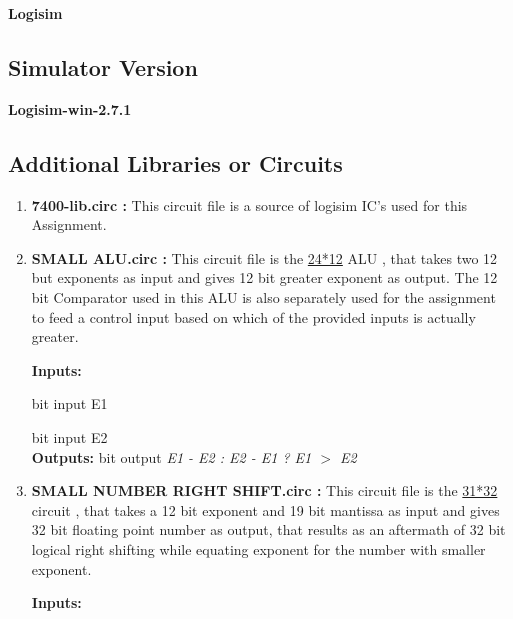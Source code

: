 \documentclass[12pt]{article}
\begin{document}
\textbf{Logisim}

\subsection{Simulator Version}

\textbf{Logisim-win-2.7.1}

\subsection{Additional Libraries or Circuits}

\begin{enumerate}
    \item \textbf{7400-lib.circ : } This circuit file is a source of logisim IC's used for this Assignment.

    \item \textbf{SMALL ALU.circ : } This circuit file is the \underline{24*12} ALU , that takes two 12 but exponents as input and gives 12 bit greater exponent as output. The 12 bit Comparator used in this ALU is also separately used for the assignment to feed a control input based on which of the provided inputs is actually greater.


    \begin{outline}

         \1 \textbf{Inputs:}
    
         bit input E1

         bit input E2\\

        

        \1 \textbf{Outputs:}
         bit output \textit{E1 - E2 : E2 - E1 ? E1 $>$ E2}\\
    
    \end{outline}

    
    

   \item \textbf{SMALL NUMBER RIGHT SHIFT.circ : } This circuit file is the \underline{31*32} circuit , that takes a 12 bit exponent and 19 bit mantissa as input and gives 32 bit floating point number as output, that results as an aftermath of 32 bit logical right shifting while equating exponent for the number with smaller exponent.

    
    \begin{outline}

        \1 \textbf{Inputs:}
    

\end{outline}
\end{enumerate}
\end{document}
